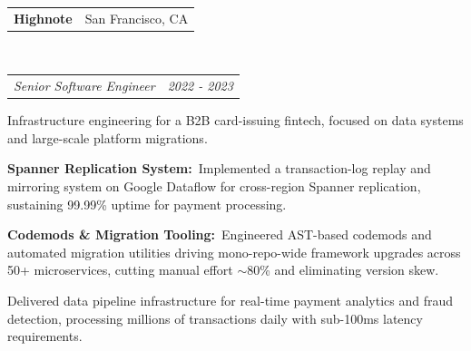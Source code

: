 \documentclass[11pt,letterpaper]{article}
\makeatletter
\newcommand{\area}[2]{{\bfseries\color{accent}#1:}~#2}
\newcommand{\headerrow}[2]{%
  \begin{tabular*}{\linewidth}{@{}l@{\extracolsep{\fill}}r@{}}#1 & #2\end{tabular*}}
\newcommand{\employment}[5]{%
  \headerrow{\textbf{#1}}{\color{muted}#2}\\
  \headerrow{{\itshape\color{accent}#3}}{\color{muted}\itshape #4}
  \begin{itemize*}
    \item #5
  \end{itemize*}
}
\makeatother
\begin{document}
\employment{Highnote}{San Francisco, CA}{Senior Software Engineer}{2022 - 2023}{
Infrastructure engineering for a B2B card-issuing fintech, focused on data systems and large-scale platform migrations.
\item \area{Spanner Replication System}{Implemented a transaction-log replay and mirroring system on Google Dataflow for cross-region Spanner replication, sustaining 99.99\% uptime for payment processing.}
\item \area{Codemods \& Migration Tooling}{Engineered AST-based codemods and automated migration utilities driving mono-repo-wide framework upgrades across 50+ microservices, cutting manual effort $\sim$80\% and eliminating version skew.}
\item Delivered data pipeline infrastructure for real-time payment analytics and fraud detection, processing millions of transactions daily with sub-100ms latency requirements.
}
\end{document}
